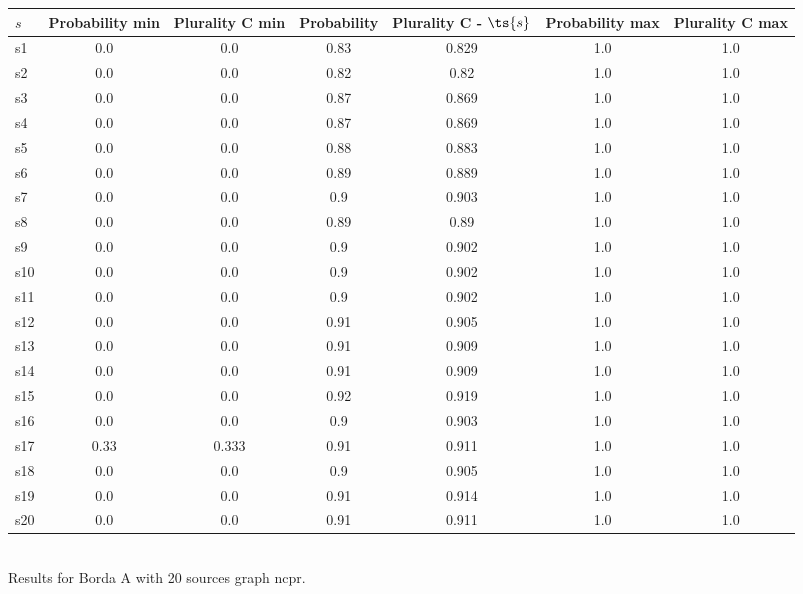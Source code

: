 \documentclass{article}
\begin{document}
\noindent\begin{tabular}{|l|c|c|c|c|c|c|}
\hline
$s$& Probability min & Plurality C min & Probability & Plurality C - $\ts{s}$ & Probability max & Plurality C max\\
\hline
s1 &0.0 & 0.0 & 0.83 & 0.829 & 1.0 & 1.0\\
\hline
s2 &0.0 & 0.0 & 0.82 & 0.82 & 1.0 & 1.0\\
\hline
s3 &0.0 & 0.0 & 0.87 & 0.869 & 1.0 & 1.0\\
\hline
s4 &0.0 & 0.0 & 0.87 & 0.869 & 1.0 & 1.0\\
\hline
s5 &0.0 & 0.0 & 0.88 & 0.883 & 1.0 & 1.0\\
\hline
s6 &0.0 & 0.0 & 0.89 & 0.889 & 1.0 & 1.0\\
\hline
s7 &0.0 & 0.0 & 0.9 & 0.903 & 1.0 & 1.0\\
\hline
s8 &0.0 & 0.0 & 0.89 & 0.89 & 1.0 & 1.0\\
\hline
s9 &0.0 & 0.0 & 0.9 & 0.902 & 1.0 & 1.0\\
\hline
s10 &0.0 & 0.0 & 0.9 & 0.902 & 1.0 & 1.0\\
\hline
s11 &0.0 & 0.0 & 0.9 & 0.902 & 1.0 & 1.0\\
\hline
s12 &0.0 & 0.0 & 0.91 & 0.905 & 1.0 & 1.0\\
\hline
s13 &0.0 & 0.0 & 0.91 & 0.909 & 1.0 & 1.0\\
\hline
s14 &0.0 & 0.0 & 0.91 & 0.909 & 1.0 & 1.0\\
\hline
s15 &0.0 & 0.0 & 0.92 & 0.919 & 1.0 & 1.0\\
\hline
s16 &0.0 & 0.0 & 0.9 & 0.903 & 1.0 & 1.0\\
\hline
s17 &0.33 & 0.333 & 0.91 & 0.911 & 1.0 & 1.0\\
\hline
s18 &0.0 & 0.0 & 0.9 & 0.905 & 1.0 & 1.0\\
\hline
s19 &0.0 & 0.0 & 0.91 & 0.914 & 1.0 & 1.0\\
\hline
s20 &0.0 & 0.0 & 0.91 & 0.911 & 1.0 & 1.0\\
\hline
\end{tabular}\\

\noindent Results for Borda A with 20 sources graph ncpr.
\end{document}

